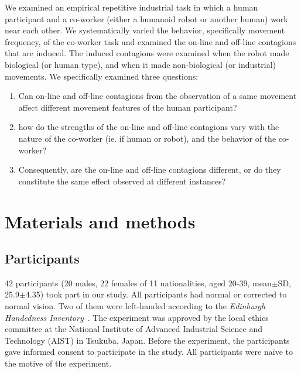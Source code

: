 We examined an empirical repetitive industrial task in which a human participant and a co-worker (either a humanoid robot or another human) work near each other. We systematically varied the behavior, specifically movement frequency, of the co-worker task and examined the on-line and off-line contagions that are induced. The induced contagions were examined when the robot made biological (or human type), and when it made non-biological (or industrial) movements. We specifically examined three questions:

\begin{enumerate}
	\item Can on-line and off-line contagions from the observation of a same movement affect different movement features of the human participant?
	\item how do the strengths of the on-line and off-line contagions vary with the nature of the co-worker (ie. if human or robot), and the behavior of the co-worker?
	\item Consequently, are the on-line and off-line contagions different, or do they constitute the same effect observed at different instances?
\end{enumerate}





\clearpage
\section{Materials and methods}

\subsection{Participants}

42 participants (20 males, 22 females of 11 nationalities, aged 20-39, mean$\pm$SD, 25.9$\pm$4.35) took part in our study. All participants had normal or corrected to normal vision. Two of them were left-handed according to the {\it Edinburgh Handedness Inventory}~\cite{robinson2013edinburgh}. The experiment was approved by the local ethics committee at the National Institute of Advanced Industrial Science and Technology (AIST) in Tsukuba, Japan. Before the experiment, the participants gave informed consent to participate in the study. All participants were na{\"i}ve to the motive of the experiment. 

